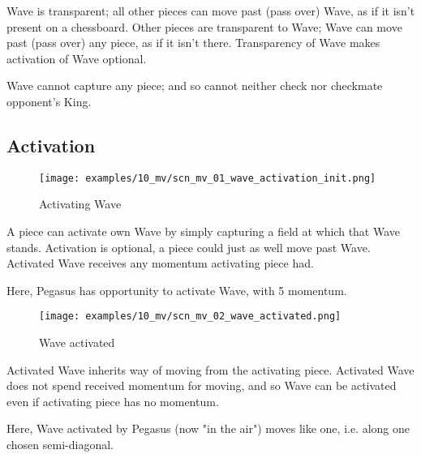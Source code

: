 Wave is transparent; all other pieces can move past (pass over) Wave, as if it
isn't present on a chessboard. Other pieces are transparent to Wave; Wave can move
past (pass over) any piece, as if it isn't there. Transparency of Wave makes
activation of Wave optional.

Wave cannot capture any piece; and so cannot neither check nor checkmate opponent's
King.

\clearpage %

\subsection*{Activation}
\label{sec:Miranda's veil/Wave/Activation}

\vspace*{-1.4\baselineskip}
\noindent
\begin{figure}[!h]
\texttt{[image: examples/10\_mv/scn\_mv\_01\_wave\_activation\_init.png]}
\vspace*{-1.3\baselineskip}
\caption{Activating Wave}
\label{fig:scn_mv_01_wave_activation_init}
\end{figure}

\vspace*{-0.3\baselineskip}
A piece can activate own Wave by simply capturing a field at which that Wave stands.
Activation is optional, a piece could just as well move past Wave. Activated Wave
receives any momentum activating piece had.

Here, Pegasus has opportunity to activate Wave, with 5 momentum.

\clearpage %

\vspace*{-2.1\baselineskip}
\noindent
\begin{figure}[!h]
\texttt{[image: examples/10\_mv/scn\_mv\_02\_wave\_activated.png]}
\caption{Wave activated}
\label{fig:scn_mv_02_wave_activated}
\end{figure}

Activated Wave inherits way of moving from the activating piece. Activated Wave
does not spend received momentum for moving, and so Wave can be activated even if
activating piece has no momentum.

Here, Wave activated by Pegasus (now "in the air") moves like one, i.e. along one
chosen semi-diagonal.

